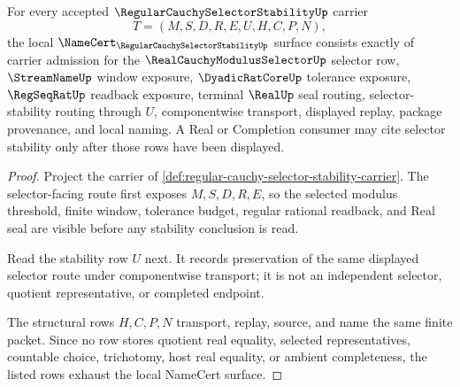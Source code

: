 \begin{theorem}
\label{thm:regular-cauchy-selector-stability-namecert-obligations}
For every accepted $\RegularCauchySelectorStabilityUp$ carrier
$$
T=(M,S,D,R,E,U,H,C,P,N),
$$
the local $\NameCert_{\RegularCauchySelectorStabilityUp}$ surface consists exactly of carrier admission for the $\RealCauchyModulusSelectorUp$ selector row, $\StreamNameUp$ window exposure, $\DyadicRatCoreUp$ tolerance exposure, $\RegSeqRatUp$ readback exposure, terminal $\RealUp$ seal routing, selector-stability routing through $U$, componentwise transport, displayed replay, package provenance, and local naming. A Real or Completion consumer may cite selector stability only after those rows have been displayed.
\end{theorem}
\begin{proof}
Project the carrier of \autoref{def:regular-cauchy-selector-stability-carrier}. The selector-facing route first exposes $M,S,D,R,E$, so the selected modulus threshold, finite window, tolerance budget, regular rational readback, and Real seal are visible before any stability conclusion is read.

Read the stability row $U$ next. It records preservation of the same displayed selector route under componentwise transport; it is not an independent selector, quotient representative, or completed endpoint.

The structural rows $H,C,P,N$ transport, replay, source, and name the same finite packet. Since no row stores quotient real equality, selected representatives, countable choice, trichotomy, host real equality, or ambient completeness, the listed rows exhaust the local NameCert surface.
\end{proof}




